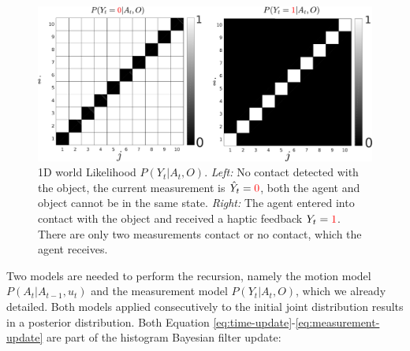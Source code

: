 \begin{figure}
 \centering
 \includegraphics[width=\textwidth]{./ch5-MLMF/Figures/explenation/hist_likelihood.pdf}
 \caption{1D world Likelihood $P(Y_t|A_t,O)$. \textit{Left:} No contact detected with the object, the current measurement 
 is $\hat{Y}_t = \textcolor{red}0$, both the agent and object cannot be in the same state. \textit{Right:} The agent 
 entered into contact with the object and received a haptic feedback $Y_t = \textcolor{red}1$. There are only two measurements 
 contact or no contact, which the agent receives.}
 \label{fig:histogram_likelihood}
\end{figure}

Two models are needed to perform the recursion, namely the motion model $P(A_t|A_{t-1},u_t)$ and the measurement model
$P(Y_t|A_t,O)$, which we already detailed. Both models applied consecutively to the initial joint distribution results in a posterior
distribution. Both Equation \ref{eq:time-update}-\ref{eq:measurement-update} are part of the histogram Bayesian filter 
update:

\begin{center}
%
\end{center}

